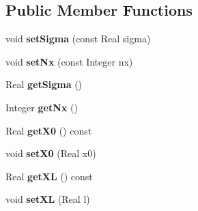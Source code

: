 \subsection*{Public Member Functions}
\begin{DoxyCompactItemize}
\item 
\hypertarget{classAllenCahnRHSFunction_adf358cca697faeabd45941ecef135e09}{
void {\bfseries setSigma} (const Real sigma)}
\label{classAllenCahnRHSFunction_adf358cca697faeabd45941ecef135e09}

\item 
\hypertarget{classAllenCahnRHSFunction_a644e239104dc69ab10d24911f65aa0f4}{
void {\bfseries setNx} (const Integer nx)}
\label{classAllenCahnRHSFunction_a644e239104dc69ab10d24911f65aa0f4}

\item 
\hypertarget{classAllenCahnRHSFunction_a74971f71276e33081609df6e2bf7e957}{
Real {\bfseries getSigma} ()}
\label{classAllenCahnRHSFunction_a74971f71276e33081609df6e2bf7e957}

\item 
\hypertarget{classAllenCahnRHSFunction_a67c6edb359ecaec56aa5d04aa4eac183}{
Integer {\bfseries getNx} ()}
\label{classAllenCahnRHSFunction_a67c6edb359ecaec56aa5d04aa4eac183}

\item 
\hypertarget{classAllenCahnRHSFunction_a23944f60ddc12bd00d5afcfac74b4862}{
Real {\bfseries getX0} () const }
\label{classAllenCahnRHSFunction_a23944f60ddc12bd00d5afcfac74b4862}

\item 
\hypertarget{classAllenCahnRHSFunction_a1a495b29623fc793b9021d5448fda2ea}{
void {\bfseries setX0} (Real x0)}
\label{classAllenCahnRHSFunction_a1a495b29623fc793b9021d5448fda2ea}

\item 
\hypertarget{classAllenCahnRHSFunction_a1b2f18b0027c7bca2dd131e7879e228e}{
Real {\bfseries getXL} () const }
\label{classAllenCahnRHSFunction_a1b2f18b0027c7bca2dd131e7879e228e}

\item 
\hypertarget{classAllenCahnRHSFunction_aed5c92e6d1d0add2ff9023547c29a2ed}{
void {\bfseries setXL} (Real l)}
\label{classAllenCahnRHSFunction_aed5c92e6d1d0add2ff9023547c29a2ed}


\end{DoxyCompactItemize}
